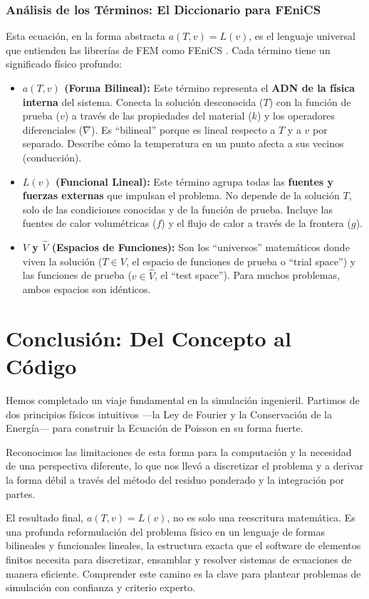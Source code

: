 \documentclass[11pt, a4paper]{article}
\begin{document}
\subsubsection*{Análisis de los Términos: El Diccionario para FEniCS}
Esta ecuación, en la forma abstracta $a(T,v) = L(v)$, es el lenguaje universal que entienden las librerías de FEM como FEniCS \cite{logg2012}. Cada término tiene un significado físico profundo:

\begin{itemize}
    \item \textbf{$a(T,v)$ (Forma Bilineal):} Este término representa el \textbf{ADN de la física interna} del sistema. Conecta la solución desconocida ($T$) con la función de prueba ($v$) a través de las propiedades del material ($k$) y los operadores diferenciales ($\nabla$). Es ``bilineal'' porque es lineal respecto a $T$ y a $v$ por separado. Describe cómo la temperatura en un punto afecta a sus vecinos (conducción).

    \item \textbf{$L(v)$ (Funcional Lineal):} Este término agrupa todas las \textbf{fuentes y fuerzas externas} que impulsan el problema. No depende de la solución $T$, solo de las condiciones conocidas y de la función de prueba. Incluye las fuentes de calor volumétricas ($f$) y el flujo de calor a través de la frontera ($g$).

    \item \textbf{$V$ y $\hat{V}$ (Espacios de Funciones):} Son los ``universos'' matemáticos donde viven la solución ($T \in V$, el espacio de funciones de prueba o ``trial space'') y las funciones de prueba ($v \in \hat{V}$, el ``test space''). Para muchos problemas, ambos espacios son idénticos.
\end{itemize}

\section{Conclusión: Del Concepto al Código}
Hemos completado un viaje fundamental en la simulación ingenieril. Partimos de dos principios físicos intuitivos —la Ley de Fourier y la Conservación de la Energía— para construir la Ecuación de Poisson en su forma fuerte.

Reconocimos las limitaciones de esta forma para la computación y la necesidad de una perspectiva diferente, lo que nos llevó a discretizar el problema y a derivar la forma débil a través del método del residuo ponderado y la integración por partes.

El resultado final, $a(T,v) = L(v)$, no es solo una reescritura matemática. Es una profunda reformulación del problema físico en un lenguaje de formas bilineales y funcionales lineales, la estructura exacta que el software de elementos finitos necesita para discretizar, ensamblar y resolver sistemas de ecuaciones de manera eficiente. Comprender este camino es la clave para plantear problemas de simulación con confianza y criterio experto.

\newpage


\end{document}
